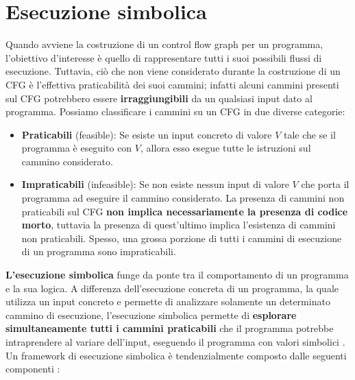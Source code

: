 \documentclass[../main.tex]{subfiles}
\begin{document}
\section{Esecuzione simbolica}
Quando avviene la costruzione di un control flow graph per un programma, l'obiettivo d'interesse è quello di rappresentare tutti i suoi possibili flussi di esecuzione.
Tuttavia, ciò che non viene considerato durante la costruzione di un CFG è l'effettiva praticabilità dei suoi cammini; infatti alcuni cammini presenti sul CFG potrebbero
essere \textbf{irraggiungibili} da un qualsiasi input dato al programma. Possiamo classificare i cammini su un CFG in due diverse categorie:
\begin{itemize}
    \item \textbf{Praticabili} (feasible): Se esiste un input concreto di valore $V$ tale che se il programma è eseguito con $V$, allora esso esegue tutte le istruzioni sul cammino considerato.
    \item \textbf{Impraticabili} (infeasible): Se non esiste nessun input di valore $V$ che porta il programma ad eseguire il cammino considerato. La presenza di cammini non praticabili sul CFG \textbf{non implica necessariamente la presenza di codice morto}, tuttavia la presenza di quest'ultimo implica l'esistenza di cammini non praticabili.
    Spesso, una grossa porzione di tutti i cammini di esecuzione di un programma sono impraticabili.
\end{itemize}
\textbf{L'esecuzione simbolica} funge da ponte tra il comportamento di un programma e la sua logica. 
A differenza dell'esecuzione concreta di un programma, la quale utilizza un input concreto e permette di analizzare solamente un determinato cammino di esecuzione,
l'esecuzione simbolica permette di \textbf{esplorare simultaneamente tutti i cammini praticabili} che il programma potrebbe intraprendere al variare dell'input, eseguendo il programma con valori simbolici \cite{Symbolic_exc_1}.
Un framework di esecuzione simbolica è tendenzialmente composto dalle seguenti componenti \cite{Symbolic_exc_1}:
\end{document}
